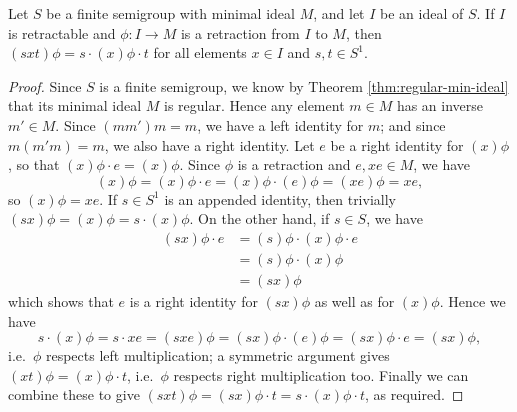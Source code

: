 \begin{lemma}
  \label{lem:retract-aux}
  Let $S$ be a finite semigroup with minimal ideal $M$, and let $I$ be
  an ideal of $S$.  If $I$ is retractable and $\phi: I \rightarrow M$ is a
  retraction from $I$ to $M$, then $(sxt)\phi=s \cdot (x)\phi \cdot t$ for all
  elements $x\in I$ and $s,t\in S^1$.
  \begin{proof}
    Since $S$ is a finite semigroup, we know by Theorem
    \ref{thm:regular-min-ideal} that its minimal ideal $M$ is regular.  Hence
    any element $m \in M$ has an inverse $m' \in M$.  Since $(mm')m = m$, we
    have a left identity for $m$; and since $m(m'm) = m$, we also have a right
    identity.  Let $e$ be a right identity for $(x)\phi$, so that
    $(x)\phi \cdot e = (x)\phi$.  Since $\phi$ is a retraction and
    $e, xe \in M$, we have
    $$(x)\phi=(x)\phi \cdot e = (x)\phi \cdot (e)\phi = (xe)\phi = xe,$$
    so $(x)\phi = xe$.
    If $s \in S^1$ is an appended identity, then trivially $(sx)\phi = (x)\phi =
    s \cdot (x)\phi$.  On the other hand, if $s \in S$, we have
    \begin{align*}
      (sx)\phi \cdot e & = (s)\phi \cdot (x)\phi \cdot e \\
                       & = (s)\phi \cdot (x)\phi \\
                       & = (sx)\phi
    \end{align*}
    which shows that $e$ is a right identity for $(sx)\phi$ as well as for
    $(x)\phi$.  Hence we have
    $$s \cdot (x)\phi = s \cdot xe = (sxe)\phi = (sx)\phi \cdot (e)\phi =
    (sx)\phi \cdot e = (sx)\phi,$$ i.e.~$\phi$ respects left multiplication; a
    symmetric argument gives $(xt)\phi = (x)\phi \cdot t$, i.e.~$\phi$ respects
    right multiplication too.  Finally we can combine these to give
    $(sxt)\phi = (sx)\phi \cdot t = s \cdot (x)\phi \cdot t$, as required.
  \end{proof}
\end{lemma}


